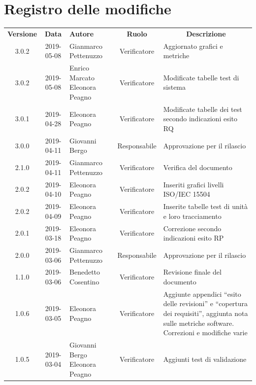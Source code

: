 \documentclass[11pt,a4paper]{article}
\begin{document}
	
	\newpage
	{\def\arraystretch{2}\tabcolsep=10pt
	
	\section*{\centering Registro delle modifiche}
	\begin{tabularx}{\textwidth}{ c | c | p{3.5cm} | c | X }
		\rowcolor{LightBlue}
		\color{white}\bfseries Versione & \color{white}\bfseries Data & \color{white}\bfseries Autore & \color{white}\bfseries Ruolo & \multicolumn{1}{c}{\color{white}\bfseries Descrizione}\\[0.25cm]
		3.0.2 & 2019-05-08 & Gianmarco Pettenuzzo & Verificatore & Aggiornato grafici e metriche \\ \hline
		3.0.2 & 2019-05-08 & Enrico Marcato \newline Eleonora Peagno & Verificatore & Modificate tabelle test di sistema \\ \hline
		3.0.1 & 2019-04-28 & Eleonora Peagno & Verificatore & Modificate tabelle dei test secondo indicazioni esito RQ \\ \hline
		3.0.0 & 2019-04-11 & Giovanni Bergo & Responsabile & Approvazione per il rilascio \\ \hline
		2.1.0 & 2019-04-11 & Gianmarco Pettenuzzo & Verificatore & Verifica del documento \\ \hline
		2.0.2 & 2019-04-10 & Eleonora Peagno & Verificatore & Inseriti grafici livelli ISO/IEC 15504 \\ \hline
		2.0.2 & 2019-04-09 & Eleonora Peagno & Verificatore & Inserite tabelle test di unità e loro tracciamento \\ \hline
		2.0.1 & 2019-03-18 & Eleonora Peagno & Verificatore & Correzione secondo indicazioni esito RP \\ \hline
		2.0.0 & 2019-03-06 & Gianmarco Pettenuzzo & Responsabile & Approvazione per il rilascio \\ \hline
		1.1.0 & 2019-03-06 & Benedetto Cosentino & Verificatore & Revisione finale del documento \\ \hline
		1.0.6 & 2019-03-05 & Eleonora Peagno & Verificatore & Aggiunte appendici ``esito delle revisioni'' e ``copertura dei requisiti'', aggiunta nota sulle metriche software. Correzioni e modifiche varie \\ \hline
		1.0.5 & 2019-03-04 & Giovanni Bergo \newline Eleonora Peagno & Verificatore & Aggiunti test di validazione \\ \hline

\end{tabularx}}
\end{document}
